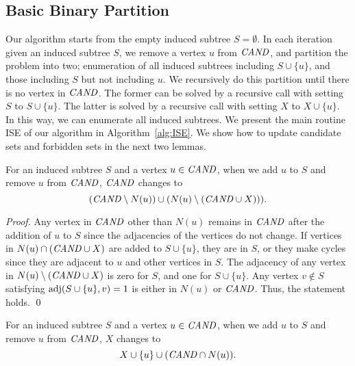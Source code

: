 \documentclass{llncs}
\newcommand{\set}[1]{\{#1\}}
\newcommand{\Can}{{\it CAND}}
\newcommand{\adj}{{\rm adj}}
\newcommand{\MyProc}[1]{{\rm \textsc{#1}}}
\begin{document}
\subsection{Basic Binary Partition}
\label{subsec:algorithm}


Our algorithm starts from the empty induced subtree $S = \emptyset$. 
In each iteration given an induced subtree $S$, 
we remove a vertex $u$ from $\Can$, 
and partition the problem into two; 
enumeration of all induced subtrees including $S\cup\set{u}$, 
and those including $S$ but not including $u$. 
We recursively do this partition 
until there is no vertex in $\Can$. 
The former can be solved 
by a recursive call with setting $S$ to $S\cup\set{u}$. 
The latter is solved 
by a recursive call with setting $X$ to $X\cup\set{u}$. 
In this way, 
we can enumerate all induced subtrees. 
We present 
the main routine \MyProc{ISE} of our algorithm 
in Algorithm~\ref{alg:ISE}.  
We show how to update candidate sets and forbidden sets in the next two lemmas. 

\begin{lemma}
    \label{lem:can:update}
    For an induced subtree $S$ and a vertex $u \in \Can$, 
    when we add $u$ to $S$ and remove $u$ from $\Can$, 
    $\Can$ changes to  
    \begin{equation*}
        (\Can\setminus N(u)) \cup (N(u) \setminus (\Can \cup X))).  
    \end{equation*}
\end{lemma}

\begin{proof}
    Any vertex in $\Can$ other than $N(u)$ 
    remains in $\Can$ after the addition of $u$ to $S$ 
    since the adjacencies of the vertices do not change. 
    If vertices in $N(u) \cap (\Can \cup X)$ are added to $S\cup\set{u}$, 
    they are in $S$, or they make cycles 
    since they are adjacent to $u$ and other vertices in $S$.  
    The adjacency of any vertex in $N(u) \setminus (\Can \cup X)$ is zero for $S$, 
    and one for $S\cup\set{u}$. 
Any vertex $v \notin S$ satisfying $\adj(S\cup\set{u}, v) = 1$ 
    is either in $N(u)$ or $\Can$. 
    Thus, the statement holds. 
    \qed
\end{proof}


\begin{lemma}
    \label{lem:X:update}
    For an induced subtree $S$ and a vertex $u \in \Can$, 
    when we add $u$ to $S$ and remove $u$ from $\Can$, 
    $X$ changes to 
    \begin{equation*}
        X \cup \set{u} \cup  (\Can \cap N(u)).  
    \end{equation*}
\end{lemma}
\end{document}
